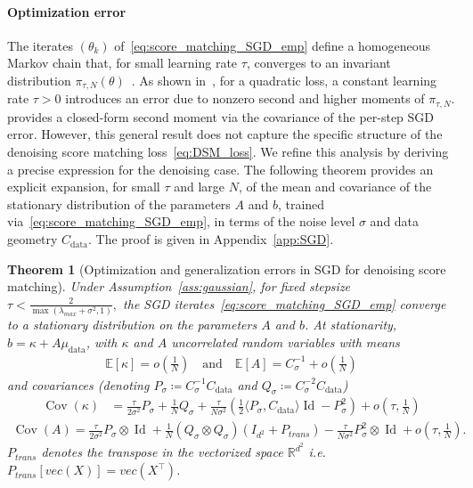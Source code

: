 \documentclass[11pt]{article}
\newtheorem{thm}{Theorem}
\newcommand{\eqdef}{\coloneqq}
\newcommand{\id}{\operatorname{Id}}
\newcommand{\RR}{\mathbb{R}}
\newcommand{\EE}{\mathbb{E}}
\newcommand{\cov}{\operatorname{Cov}}
\begin{document}
\paragraph{Optimization error} The iterates \( (\theta_k) \) of~\eqref{eq:score_matching_SGD_emp} define a homogeneous Markov chain that, for small learning rate \( \tau \), converges to an invariant distribution \( \pi_{\tau, N}(\theta) \)~\cite{meyn2012markov, bach2013non}. As shown in~\cite{bach2013non}, for a quadratic loss, a constant learning rate  \( \tau > 0 \) introduces an error due to nonzero second and higher moments of \( \pi_{\tau, N} \). \cite[Proposition 3]{dieuleveut2020bridging} provides a closed-form second moment via the covariance of the per-step SGD error. However, this general result does not capture the specific structure of the denoising score matching loss~\eqref{eq:DSM_loss}. We refine this analysis by deriving a precise expression for the denoising case. The following theorem provides an explicit expansion, for small \( \tau \) and large \( N \), of the mean and covariance of the stationary distribution of the parameters \( A \) and \( b \), trained via~\eqref{eq:score_matching_SGD_emp}, in terms of the noise level \( \sigma \) and data geometry \( C_{\mathrm{data}} \). The proof is given in Appendix~\ref{app:SGD}.


\begin{thm}[Optimization and generalization errors in SGD for denoising score matching] \label{thm:SGD_error}
Under Assumption~\ref{ass:gaussian}, for fixed stepsize $\tau < \frac{2}{\max\left( \lambda_{max} + \sigma^2, 1 \right)},$ the SGD iterates~\eqref{eq:score_matching_SGD_emp} converge to a stationary distribution on the parameters $A$ and $b$. At stationarity, $b = \kappa + A \mu_\mathrm{data}$, with $\kappa$ and $A$ uncorrelated random variables with means
\begin{align*}
 \EE[\kappa] =  o\left( \frac{1}{N}\right)\quad\text{and}\quad \EE[A] = C_\sigma^{-1} + o\left( \frac{1}{N}\right)
\end{align*}
and covariances (denoting $P_\sigma \eqdef C_\sigma^{-1} C_\mathrm{data}$ and $Q_\sigma \eqdef C_\sigma^{-2}C_\mathrm{data}$)
\begin{equation*}
\begin{split}
\cov(\kappa) &= \frac{\tau}{2 \sigma^2} P_\sigma +  \frac{1}{N} Q_\sigma + \frac{\tau}{N \sigma^2} \left( \frac12 \langle P_\sigma, C_\mathrm{data} \rangle \id -  P_\sigma^2 \right) 
+ o \left(\tau, \frac{1}{N}\right) 
\end{split}
\end{equation*}
\begin{equation*}
\begin{split}
\cov(A)  = \frac{\tau}{2\sigma^2} P_\sigma \otimes \id + \frac{1}{N} \left( Q_\sigma \otimes Q_\sigma \right) (I_{d^2} + P_{trans})  -  \frac{\tau}{N \sigma^2} P_\sigma^2 \otimes \id  + o\left(\tau, \frac{1}{N}\right) .
\end{split}
\end{equation*}
$P_{trans}$ denotes the transpose in the vectorized space $\RR^{d^2}$  i.e. $P_{trans}[vec(X)] = vec(X^\top)$.
\end{thm}
\end{document}

